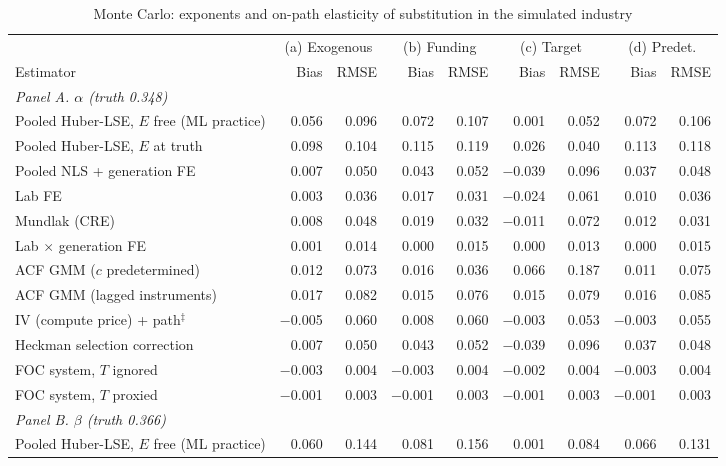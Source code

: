 \begin{table}[!htbp]
\centering
\begin{threeparttable}
\caption{Monte Carlo: exponents and on-path elasticity of substitution in the simulated industry}
\label{tab:mc_industry_exponents}
\footnotesize
\begin{tabular}{lrrrrrrrr}
\toprule
 & \multicolumn{2}{c}{(a) Exogenous} & \multicolumn{2}{c}{(b) Funding} & \multicolumn{2}{c}{(c) Target} & \multicolumn{2}{c}{(d) Predet.} \\
\cmidrule(lr){2-3} \cmidrule(lr){4-5} \cmidrule(lr){6-7} \cmidrule(lr){8-9}
Estimator & Bias & RMSE & Bias & RMSE & Bias & RMSE & Bias & RMSE \\
\midrule
\multicolumn{9}{l}{\textit{Panel A. $\alpha$ (truth 0.348)}} \\
Pooled Huber-LSE, $E$ free (ML practice) & 0.056 & 0.096 & 0.072 & 0.107 & 0.001 & 0.052 & 0.072 & 0.106 \\
Pooled Huber-LSE, $E$ at truth & 0.098 & 0.104 & 0.115 & 0.119 & 0.026 & 0.040 & 0.113 & 0.118 \\
Pooled NLS + generation FE & 0.007 & 0.050 & 0.043 & 0.052 & $-$0.039 & 0.096 & 0.037 & 0.048 \\
Lab FE & 0.003 & 0.036 & 0.017 & 0.031 & $-$0.024 & 0.061 & 0.010 & 0.036 \\
Mundlak (CRE) & 0.008 & 0.048 & 0.019 & 0.032 & $-$0.011 & 0.072 & 0.012 & 0.031 \\
Lab $\times$ generation FE & 0.001 & 0.014 & 0.000 & 0.015 & 0.000 & 0.013 & 0.000 & 0.015 \\
ACF GMM ($c$ predetermined) & 0.012 & 0.073 & 0.016 & 0.036 & 0.066 & 0.187 & 0.011 & 0.075 \\
ACF GMM (lagged instruments) & 0.017 & 0.082 & 0.015 & 0.076 & 0.015 & 0.079 & 0.016 & 0.085 \\
IV (compute price) + path$^{\ddagger}$ & $-$0.005 & 0.060 & 0.008 & 0.060 & $-$0.003 & 0.053 & $-$0.003 & 0.055 \\
Heckman selection correction & 0.007 & 0.050 & 0.043 & 0.052 & $-$0.039 & 0.096 & 0.037 & 0.048 \\
FOC system, $T$ ignored & $-$0.003 & 0.004 & $-$0.003 & 0.004 & $-$0.002 & 0.004 & $-$0.003 & 0.004 \\
FOC system, $T$ proxied & $-$0.001 & 0.003 & $-$0.001 & 0.003 & $-$0.001 & 0.003 & $-$0.001 & 0.003 \\
\midrule
\multicolumn{9}{l}{\textit{Panel B. $\beta$ (truth 0.366)}} \\
Pooled Huber-LSE, $E$ free (ML practice) & 0.060 & 0.144 & 0.081 & 0.156 & 0.001 & 0.084 & 0.066 & 0.131 \\

\end{tabular}
\end{threeparttable}
\end{table}

